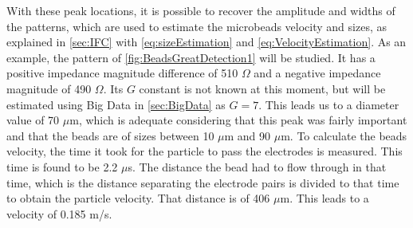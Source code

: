 With these peak locations, it is possible to recover the amplitude and widths of the patterns, which are used to estimate the microbeads velocity and sizes, as explained in \autoref{sec:IFC} with \autoref{eq:sizeEstimation} and \autoref{eq:VelocityEstimation}. As an example, the pattern of \autoref{fig:BeadsGreatDetection1} will be studied. It has a positive impedance magnitude difference of 510 $\Omega$ and a negative impedance magnitude of 490 $\Omega$. Its $G$ constant is not known at this moment, but will be estimated using Big Data in \autoref{sec:BigData} as $G=7$. This leads us to a diameter value of 70 $\mu$m, which is adequate considering that this peak was fairly important and that the beads are of sizes between 10 $\mu$m and 90 $\mu$m. To calculate the beads velocity, the time it took for the particle to pass the electrodes is measured. This time is found to be 2.2 $\mu$s. The distance the bead had to flow through in that time, which is the distance separating the electrode pairs is divided to that time to obtain the particle velocity. That distance is of 406 $\mu$m. This leads to a velocity of 0.185 m/s.